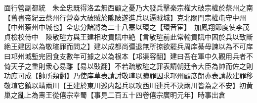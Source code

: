 面行營副都統　朱全忠既得洛孟無西顧之憂乃大發兵擊秦宗權大破宗權於蔡州之南【舊書帝紀云蔡州行營奏大破賊於隴陂遂進兵以逼賊城】克北關門宗權屯守中州【中州蔡州中城也】全忠分諸將為二十八寨以環之【環音宦】　加鳳翔節度使李茂貞檢校侍中　陳敬瑄方與王建相攻貢賦中絶【言敬瑄前此常輸貢賦中困於兵以致斷絶王建因以為敬瑄罪而問之】建以成都尚彊退無所掠欲罷兵周庠綦毋諫以為不可庠曰邛州城塹完固食支數年可據之以為根本【邛渠容翻】建曰吾在軍中久觀用兵者不倚天子之重則衆心易離【易以䜴翻】不若疏敬瑄之罪表請朝廷令大臣為帥而佐之則功庶可成【帥所類翻】乃使庠草表請討敬瑄以贖罪因求邛州顧彦朗亦表請赦建罪移敬瑄它鎮以靖兩川【王建於東川巡内起兵以攻西川連兵不決兩川皆為之不安】初黄巢之亂上為夀王從僖宗幸蜀【事見二百五十四卷僖宗廣明元年】時事出倉